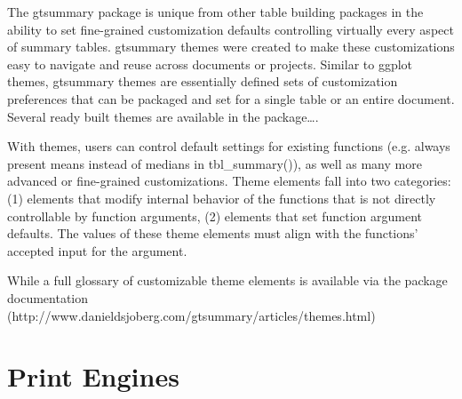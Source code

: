 The gtsummary package is unique from other table building packages in the ability to set fine-grained customization defaults controlling virtually every aspect of summary tables. 
gtsummary themes were created to make these customizations easy to navigate and reuse across documents or projects. 
Similar to ggplot themes, gtsummary themes are essentially defined sets of customization preferences that can be packaged and set for a single table or an entire document. 
Several ready built themes are available in the package….

With themes, users can control default settings for existing functions (e.g. always present means instead of medians in tbl_summary()), as well as many more advanced or fine-grained customizations. Theme elements fall into two categories: (1) elements that modify internal behavior of the functions that is not directly controllable by function arguments, (2) elements that set function argument defaults. The values of these theme elements must align with the functions’ accepted input for the argument.

While a full glossary of customizable theme elements is available via the package documentation (http://www.danieldsjoberg.com/gtsummary/articles/themes.html)
\section{Print Engines}\label{print-engines}



\address{Daniel D. Sjoberg\\
  Memorial Sloan Kettering Cancer Center\\
  1275 York Ave., New York, New York 10022\\
  USA\\
  ORCID 0000-0003-0862-2018\\
  }

\address{Karissa Whiting\\
  Memorial Sloan Kettering Cancer Center\\
  1275 York Ave., New York, New York 10022\\
  USA\\
  ORCID 0000-0002-4683-1868\\
  }

\address{Michael Curry\\
  Memorial Sloan Kettering Cancer Center\\
  1275 York Ave., New York, New York 10022\\
  USA\\
  ORCID 0000-0002-0261-4044\\
  }
